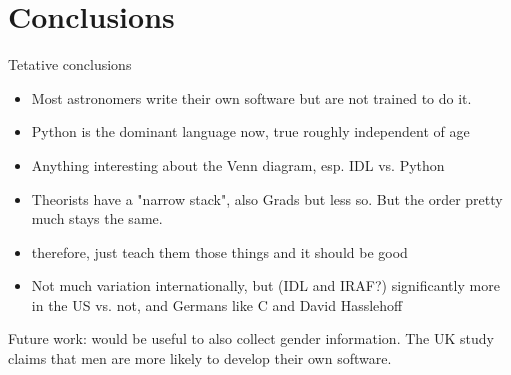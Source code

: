 \section{Conclusions}

Tetative conclusions
\begin{itemize}
\item Most astronomers write their own software but are not trained to do it.
\item Python is the dominant language now, true roughly independent of age
\item Anything interesting about the Venn diagram, esp. IDL vs. Python
\item Theorists have a "narrow stack", also Grads but less so.  But the order pretty much stays the same.
\item therefore, just teach them those things and it should be good
\item Not much variation internationally, but (IDL and IRAF?) significantly more in the US vs. not, and Germans like C and David Hasslehoff
\end{itemize}

Future work: would be useful to also collect gender information. The UK study claims that men are more likely to develop their own software. 